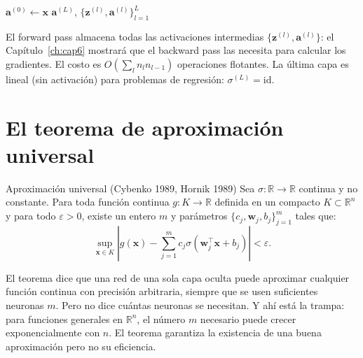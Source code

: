 \begin{algorithm}[H]
\caption{Forward pass del MLP}
\label{alg:forward}
 
$\bm{a}^{(0)} \leftarrow \bm{x}$\;
\Return $\bm{a}^{(L)}$,
  $\{\bm{z}^{(l)}, \bm{a}^{(l)}\}_{l=1}^L$\;
\end{algorithm}
 
El forward pass almacena todas las activaciones intermedias
$\{\bm{z}^{(l)}, \bm{a}^{(l)}\}$: el Capítulo~\ref{ch:cap6} mostrará que
el backward pass las necesita para calcular los gradientes. El costo es
$O(\sum_l n_l n_{l-1})$ operaciones flotantes. La última capa es lineal
(sin activación) para problemas de regresión: $\sigma^{(L)} = \text{id}$.

\section{El teorema de aproximación universal}
\label{sec:universal}


\begin{teorema}{Aproximación universal (Cybenko 1989, Hornik 1989)}
\label{thm:universal}
Sea $\sigma: \mathbb{R} \to \mathbb{R}$ continua y no constante. Para
toda función continua $g: K \to \mathbb{R}$ definida en un compacto
$K \subset \mathbb{R}^n$ y para todo $\varepsilon > 0$, existe un
entero $m$ y parámetros $\{c_j, \bm{w}_j, b_j\}_{j=1}^m$ tales que:
\begin{equation}
  \sup_{\bm{x} \in K}\left|g(\bm{x})
  - \sum_{j=1}^m c_j\sigma(\bm{w}_j^\top\bm{x}+b_j)\right|
  < \varepsilon.
  \label{eq:universal}
\end{equation}
\end{teorema}

El teorema dice que una red de una sola capa oculta puede aproximar
cualquier función continua con precisión arbitraria, siempre que se
usen suficientes neuronas $m$. Pero no dice cuántas neuronas se
necesitan. Y ahí está la trampa: para funciones generales en
$\mathbb{R}^n$, el número $m$ necesario puede crecer exponencialmente
con $n$. El teorema garantiza la existencia de una buena aproximación
pero no su eficiencia.

